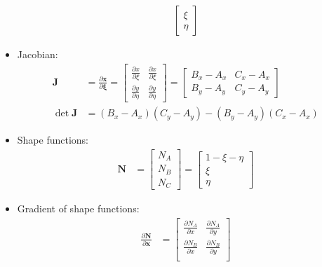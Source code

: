 \documentclass[10pt]{article}
\begin{document}
\begin{itemize}
\begin{align}
            \begin{bmatrix}
                \xi \\
                \eta
            \end{bmatrix}
        \end{align}
    \item Jacobian:
        \begin{align}
            \mathbf{J} &= \frac{\partial \mathbf{x}}{\partial \boldsymbol{\xi}}
            =
            \begin{bmatrix}
                \frac{\partial x}{\partial \xi} & \frac{\partial x}{\partial \xi} \\
                \frac{\partial y}{\partial \eta} & \frac{\partial y}{\partial \eta}
            \end{bmatrix}
            =
            \begin{bmatrix}
                B_x - A_x & C_x - A_x \\
                B_y - A_y & C_y - A_y
            \end{bmatrix} \\
            \det \mathbf{J}
            &= (B_x - A_x)(C_y - A_y) - (B_y - A_y)(C_x - A_x)
        \end{align}
    \item Shape functions:
        \begin{align}
            \mathbf{N}
            &=
            \begin{bmatrix}
                N_A \\
                N_B \\
                N_C
            \end{bmatrix}
            =
            \begin{bmatrix}
                1- \xi - \eta \\
                \xi \\
                \eta
            \end{bmatrix}
        \end{align}
    \item Gradient of shape functions:
        \begin{align}
            \frac{\partial \mathbf{N}}{\partial \mathbf{x}}
            &=
            \begin{bmatrix}
                \frac{\partial N_A}{\partial x} & \frac{\partial N_A}{\partial y} \\
                \frac{\partial N_B}{\partial x} & \frac{\partial N_B}{\partial y} \\

\end{bmatrix}
\end{align}
\end{itemize}
\end{document}
